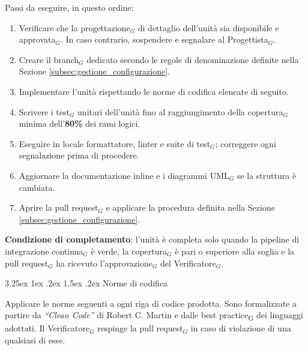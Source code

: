 \documentclass[a4paper, 10pt]{article}
\makeatletter
\renewcommand\paragraph{\@startsection{paragraph}{4}{\z@}%
  {3.25ex \@plus1ex \@minus .2ex}%
  {1.5ex \@plus .2ex}%
  {\normalfont\normalsize\bfseries}}
\makeatother
\begin{document}
\noindent Passi da eseguire, in questo ordine:
\begin{enumerate}
    \item Verificare che la progettazione$_G$ di dettaglio dell'unità sia disponibile e approvata$_G$. In caso contrario, sospendere e segnalare al Progettista$_G$.
    \item Creare il branch$_G$ dedicato secondo le regole di denominazione definite nella Sezione \ref{subsec:gestione_configurazione}.
    \item Implementare l'unità rispettando le norme di codifica elencate di seguito.
    \item Scrivere i test$_G$ unitari dell'unità fino al raggiungimento della copertura$_G$ minima dell'\textbf{80\%} dei rami logici.
    \item Eseguire in locale formattatore, linter e suite di test$_G$; correggere ogni segnalazione prima di procedere.
    \item Aggiornare la documentazione inline e i diagrammi UML$_G$ se la struttura è cambiata.
    \item Aprire la pull request$_G$ e applicare la procedura definita nella Sezione \ref{subsec:gestione_configurazione}.
\end{enumerate}

\noindent \textbf{Condizione di completamento}: l'unità è completa solo quando la pipeline di integrazione continua$_G$ è verde, la copertura$_G$ è pari o superiore alla soglia e la pull request$_G$ ha ricevuto l'approvazione$_G$ del Verificatore$_G$.

\paragraph{Norme di codifica}

Applicare le norme seguenti a ogni riga di codice prodotta. Sono formalizzate a partire da \textit{``Clean Code''} di Robert C. Martin e dalle best practice\textsubscript{G} dei linguaggi adottati. Il Verificatore$_G$ respinge la pull request$_G$ in caso di violazione di una qualsiasi di esse.
\end{document}
